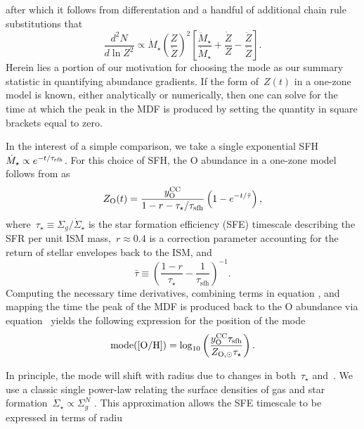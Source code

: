 after which it follows from differentation and a handful of additional chain
rule substitutions that
\begin{equation}
\frac{d^2N}{d \ln Z^2} \propto \dot{M}_\star
\left(\frac{Z}{\dot{Z}}\right)^2
\left[
\frac{\ddot{M}_\star}{\dot{M}_\star} + \frac{\dot{Z}}{Z} -
\frac{\ddot{Z}}{\dot{Z}}
\right].
\label{outflows:eq:mdf-derivative}
\end{equation}
Herein lies a portion of our motivation for choosing the mode as our summary
statistic in quantifying abundance gradients.
If the form of~$Z(t)$ in a one-zone model is known, either analytically or
numerically, then one can solve for the time at which the peak in the MDF is
produced by setting the quantity in square brackets equal to zero.
\par
In the interest of a simple comparison, we take a single exponential SFH
$\dot{M}_\star \propto e^{-t / \tau_\text{sfh}}$.
For this choice of SFH, the O abundance in a one-zone model follows from
\citet{Weinberg2017b} as 
\begin{equation}
Z_\text{O}(t) = \frac{y_\text{O}^\text{CC}}{1 - r - \tau_\star / \tau_\text{sfh}}
\left(1 - e^{-t / \bar{\tau}}\right),
\label{outflows:eq:zo-waf17}
\end{equation}
where~$\tau_\star \equiv \Sigma_g / \dot{\Sigma}_\star$ is the star formation
efficiency (SFE) timescale describing the SFR per unit ISM mass,~$r \approx 0.4$
is a correction parameter accounting for the return of stellar envelopes back
to the ISM, and
\begin{equation}
\bar{\tau} \equiv \left(
\frac{1 - r}{\tau_\star} - \frac{1}{\tau_\text{sfh}}
\right)^{-1}.
\label{outflows:eq:taubar-def}
\end{equation}
Computing the necessary time derivatives, combining terms in equation
, and mapping the time the peak of the MDF is
produced back to the O abundance via equation~
yields the following expression for the position of the mode
\begin{equation}
\text{mode([O/H])} = \log_{10} \left(
\frac{y_\text{O}^\text{CC} \tau_\text{sfh}}{Z_{\text{O},\odot} \tau_\star}
\right).
\end{equation}
\par
In principle, the mode will shift with radius due to changes in
both~$\tau_\star$ and~.
We use a classic single power-law relating the surface densities of gas and
star formation~$\dot{\Sigma}_\star \propto \Sigma_g^N$
\citep[e.g.,][]{Kennicutt1998}.
This approximation allows the SFE timescale to be expressed in terms of radiu
